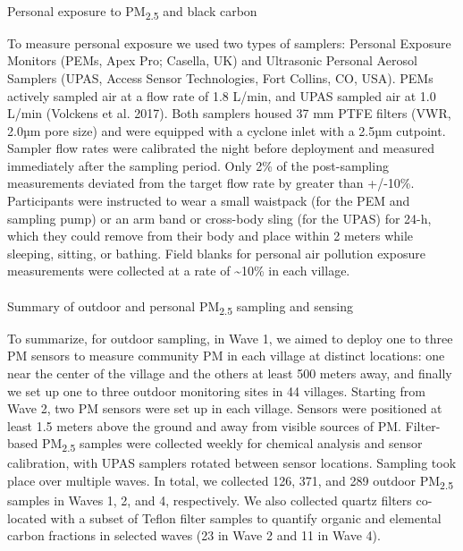 \documentclass[
  letterpaper,
  DIV=11,
  numbers=noendperiod]{scrartcl}
\makeatletter
\let\oldparagraph\paragraph
\renewcommand{\paragraph}{
    \@ifstar
      \xxxParagraphStar
      \xxxParagraphNoStar
  }
\newcommand{\xxxParagraphStar}[1]{\oldparagraph*{#1}\mbox{}}
\newcommand{\xxxParagraphNoStar}[1]{\oldparagraph{#1}\mbox{}}
\makeatother
\begin{document}
\paragraph{\texorpdfstring{Personal exposure to PM\textsubscript{2.5}
and black
carbon}{Personal exposure to PM2.5 and black carbon}}\label{personal-exposure-to-pm2.5-and-black-carbon}

To measure personal exposure we used two types of samplers: Personal
Exposure Monitors (PEMs, Apex Pro; Casella, UK) and Ultrasonic Personal
Aerosol Samplers (UPAS, Access Sensor Technologies, Fort Collins, CO,
USA). PEMs actively sampled air at a flow rate of 1.8 L/min, and UPAS
sampled air at 1.0 L/min (Volckens et al. 2017). Both samplers housed 37
mm PTFE filters (VWR, 2.0µm pore size) and were equipped with a cyclone
inlet with a 2.5µm cutpoint. Sampler flow rates were calibrated the
night before deployment and measured immediately after the sampling
period. Only 2\% of the post-sampling measurements deviated from the
target flow rate by greater than +/-10\%. Participants were instructed
to wear a small waistpack (for the PEM and sampling pump) or an arm band
or cross-body sling (for the UPAS) for 24-h, which they could remove
from their body and place within 2 meters while sleeping, sitting, or
bathing. Field blanks for personal air pollution exposure measurements
were collected at a rate of \textasciitilde10\% in each village.

\paragraph{\texorpdfstring{Summary of outdoor and personal
PM\textsubscript{2.5} sampling and
sensing}{Summary of outdoor and personal PM2.5 sampling and sensing}}\label{summary-of-outdoor-and-personal-pm2.5-sampling-and-sensing}

To summarize,  for outdoor sampling, in Wave 1, we aimed
to deploy one to three PM sensors to measure community PM in each
village at distinct locations: one near the center of the village and
the others at least 500 meters away, and finally we set up one to three
outdoor monitoring sites in 44 villages. Starting from Wave 2, two PM
sensors were set up in each village. Sensors were positioned at least
1.5 meters above the ground and away from visible sources of PM.
Filter-based PM\textsubscript{2.5} samples were collected weekly for
chemical analysis and sensor calibration, with UPAS samplers rotated
between sensor locations. Sampling took place over multiple waves. In
total, we collected 126, 371, and 289 outdoor PM\textsubscript{2.5}
samples in Waves 1, 2, and 4, respectively. We also collected quartz
filters co-located with a subset of Teflon filter samples to quantify
organic and elemental carbon fractions in selected waves (23 in Wave 2
and 11 in Wave 4).
\end{document}
